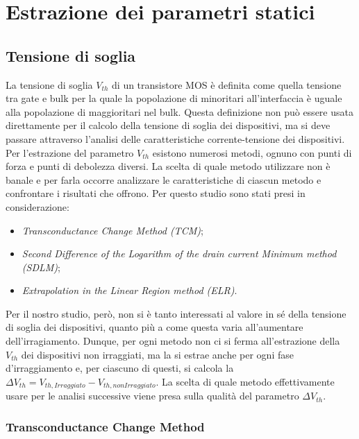 \documentclass[12pt, letterpaper]{book}
\begin{document}
\chapter{Estrazione dei parametri statici}

\section{Tensione di soglia}

La tensione di soglia $V_{th}$ di un transistore MOS è definita come quella tensione tra gate e bulk per la quale la popolazione di minoritari all'interfaccia è uguale alla popolazione di maggioritari nel bulk. Questa definizione non può essere usata direttamente per il calcolo della tensione di soglia dei dispositivi, ma si deve passare attraverso l'analisi delle caratteristiche corrente-tensione dei dispositivi. \\
Per l'estrazione del parametro $V_{th}$ esistono numerosi metodi, ognuno con punti di forza e punti di debolezza diversi. La scelta di quale metodo utilizzare non è banale e per farla occorre analizzare le caratteristiche di ciascun metodo e confrontare i risultati che offrono. Per questo studio sono stati presi in considerazione:

\begin{itemize}
  \item \emph{Transconductance Change Method (TCM)};
  \item \emph{Second Difference of the Logarithm of the drain current Minimum method (SDLM)};
  \item \emph{Extrapolation in the Linear Region method (ELR)}.
\end{itemize}

Per il nostro studio, però, non si è tanto interessati al valore in sé della tensione di soglia dei dispositivi, quanto più a come questa varia all'aumentare dell'irragiamento. Dunque, per ogni metodo non ci si ferma all'estrazione della $V_{th}$ dei dispositivi non irraggiati, ma la si estrae anche per ogni fase d'irraggiamento e, per ciascuno di questi, si calcola la $\Delta V_{th} = V_{th, Irraggiato}-V_{th, non Irraggiato}$. La scelta di quale metodo effettivamente usare per le analisi successive viene presa sulla qualità del parametro $\Delta V_{th}$.


\subsection{Transconductance Change Method}
\end{document}
